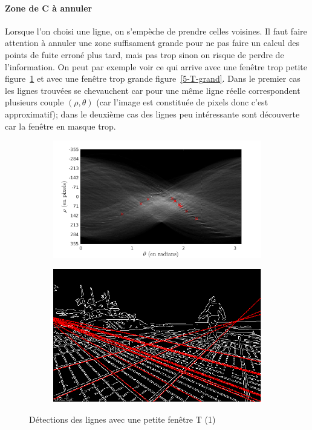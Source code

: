 \documentclass{article}
\begin{document}
\paragraph{Zone de C à annuler}
Lorsque l'on choisi une ligne, on s'empèche de prendre celles voisines. Il faut faire attention à annuler une zone suffisament grande pour ne pas faire un calcul des points de fuite erroné plus tard, mais pas trop sinon on risque de perdre de l'information. On peut par exemple voir ce qui arrive avec une fenêtre trop petite figure~\ref{5-T-petit} et avec une fenêtre trop grande figure~\ref{5-T-grand}. Dans le premier cas les lignes trouvées se chevauchent car pour une même ligne réelle correspondent plusieurs couple $(\rho, \theta)$ (car l'image est constituée de pixels donc c'est approximatif); dans le deuxième cas des lignes peu intéressante sont découverte car la fenêtre en masque trop.
\begin{figure}[!ht]
    \centering
    \begin{subfigure}[c]{0.49\linewidth}
        \centering
        \includegraphics[width=\linewidth]{images/5-C_Tpetit.png}
    \end{subfigure}
    \hfill
    \begin{subfigure}[c]{0.49\linewidth}
        \centering
        \includegraphics[width=\linewidth]{images/5-lines_Tpetit.png}
    \end{subfigure}
    \caption{Détections des lignes avec une petite fenêtre T (1)}
    \label{5-T-petit}
\end{figure}
\end{document}
